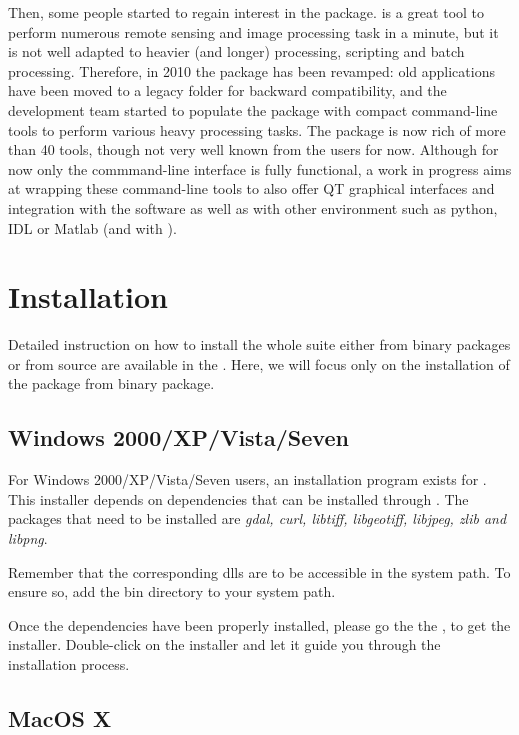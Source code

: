 Then, some people started to regain interest in the \app package. \mont
is a great tool to perform numerous remote sensing and image
processing task in a minute, but it is not well adapted to heavier
(and longer) processing, scripting and batch processing. Therefore, in
2010 the \app package has been revamped: old applications have been
moved to a legacy folder for backward compatibility, and the
development team started to populate the package with compact
command-line tools to perform various heavy processing tasks. The
package is now rich of more than 40 tools, though not very well known
from the users for now. Although for now only the commmand-line
interface is fully functional, a work in progress aims at wrapping these
command-line tools to also offer QT graphical interfaces and integration
with the \qgis software as well as with other environment such as python,
IDL or Matlab (and with \mont).

\section{Installation}\label{sec:appinstall}

Detailed instruction on how to install the whole \otb suite either
from binary packages or from source are available in the \sg. Here, we
will focus only on the installation of the \app package from binary
package.

\subsection{Windows 2000/XP/Vista/Seven}
\label{ssec:app_windows_binaries}

For Windows 2000/XP/Vista/Seven users, an installation program exists
for \app. This installer depends on dependencies that can
be installed through \osgeow. The packages that need to be installed
are \emph{gdal, curl, libtiff, libgeotiff, libjpeg, zlib and libpng}.

Remember that the corresponding dlls are to be accessible in the
system path. To ensure so, add the \osgeow bin directory to your
system path.

 Once the dependencies have been properly installed, please go the the
 \download, to get the installer. Double-click on the installer and
 let it guide you through the installation process.

\subsection{MacOS X}
\label{ssec:mac_binaries}

